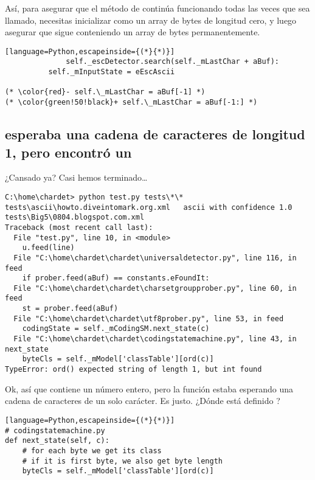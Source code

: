Así, para asegurar que el método  de  continúa funcionando todas las veces que sea llamado, necesitas inicializar  como un array de bytes de longitud cero, y luego asegurar que sigue conteniendo un array de bytes permanentemente.


\begin{lstlisting}[language=Python,escapeinside={(*}{*)}]
              self._escDetector.search(self._mLastChar + aBuf):
          self._mInputState = eEscAscii

(* \color{red}- self.\_mLastChar = aBuf[-1] *)
(* \color{green!50!black}+ self.\_mLastChar = aBuf[-1:] *)
\end{lstlisting}

\subsection{ esperaba una cadena de caracteres de longitud 1, pero encontró un }

¿Cansado ya? Casi hemos terminado\ldots


\noindent\begin{minipage}{\textwidth}
\begin{lstlisting}[breaklines=true]
C:\home\chardet> python test.py tests\*\*
tests\ascii\howto.diveintomark.org.xml   ascii with confidence 1.0
tests\Big5\0804.blogspot.com.xml
Traceback (most recent call last):
  File "test.py", line 10, in <module>
    u.feed(line)
  File "C:\home\chardet\chardet\universaldetector.py", line 116, in feed
    if prober.feed(aBuf) == constants.eFoundIt:
  File "C:\home\chardet\chardet\charsetgroupprober.py", line 60, in feed
    st = prober.feed(aBuf)
  File "C:\home\chardet\chardet\utf8prober.py", line 53, in feed
    codingState = self._mCodingSM.next_state(c)
  File "C:\home\chardet\chardet\codingstatemachine.py", line 43, in next_state
    byteCls = self._mModel['classTable'][ord(c)]
TypeError: ord() expected string of length 1, but int found
\end{lstlisting}
\end{minipage}

Ok, así que  contiene un número entero, pero la función  estaba esperando una cadena de caracteres de un solo carácter. Es justo. ¿Dónde está definido ?

\begin{lstlisting}[language=Python,escapeinside={(*}{*)}]
# codingstatemachine.py
def next_state(self, c):
    # for each byte we get its class
    # if it is first byte, we also get byte length
    byteCls = self._mModel['classTable'][ord(c)]
\end{lstlisting}

